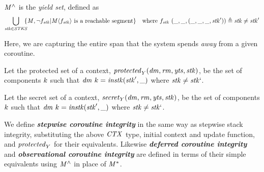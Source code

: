\documentclass[acmsmall,review,anonymous]{acmart}\settopmatter{printfolios=true,printccs=false,printacmref=false}
\begin{document}
{%


 \(\mathit{M}^\wedge\) is the \emph{yield set}, defined as
\[\begin{aligned}
\bigcup_{\mathit{stk} \in \mathit{STKS}} \hspace{-.5em} \{\mathit{M}, \neg f_{\mathit{stk}} | \mathit{M}\langle f_{\mathit{stk}} \rangle
\text{ is a reachable segment}\} \hspace{1em} &
\text{where } f_{\mathit{stk}} ~ (\mbox{\_},\mbox{\_},(\mbox{\_},\mbox{\_},\mbox{\_},\mathit{stk}')) \triangleq \mathit{stk} \not = \mathit{stk}' \\
\end{aligned}\]

Here, we are capturing the entire span that the system spends {\em away} from a given
coroutine.

Let the protected set of a context, \(\mathit{protected}_Y(\mathit{dm},\mathit{rm},\mathit{yts},\mathit{stk})\),
be the set of components \(k\) such that
\(\mathit{dm} ~ k = \mathit{instk}(\mathit{stk}',\mbox{\_})\) where \(\mathit{stk} \not = \mathit{stk}`\).

Let the secret set of a context, \(\mathit{secret}_Y(\mathit{dm},\mathit{rm},\mathit{yts},\mathit{stk})\),
be the set of components \(k\) such that
\(\mathit{dm} ~ k = \mathit{instk}(\mathit{stk}',\mbox{\_})\) where \(\mathit{stk} \not = \mathit{stk}`\).

We define \textbf{\em stepwise coroutine integrity} in the same way as stepwise stack integrity,
substituting the above \(\mathit{CTX}\) type, initial context and update
function, and \(\mathit{protected}_Y\) for their equivalents. Likewise
\textbf{\em deferred coroutine integrity} and \textbf{\em observational coroutine integrity} are defined
in terms of their simple equivalents using \(\mathit{M}^\wedge\) in place of \(\mathit{M}^*\).

}
\end{document}
